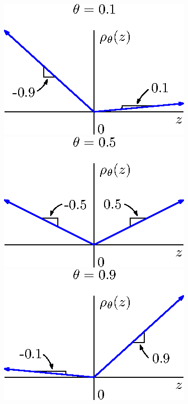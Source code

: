\begin{figure}[h]
  \begin{minipage}[t]{0.33\linewidth}
    \centering
    \includegraphics{check-loss-0-1}
  \end{minipage}
  \begin{minipage}[t]{0.33\linewidth}
    \centering
    \includegraphics{check-loss-0-5}
  \end{minipage}
  \begin{minipage}[t]{0.33\linewidth}
    \centering
    \includegraphics{check-loss-0-9}
  \end{minipage}
  
\end{figure}


